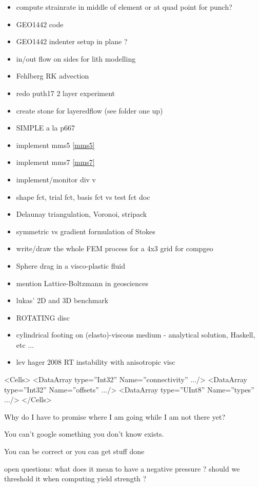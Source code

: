 \begin{itemize}
\item compute strainrate in middle of element or at quad point for punch?
\item GEO1442 code 
\item GEO1442 indenter setup in plane ?
\item in/out flow on sides for lith modelling
\item Fehlberg RK advection
\item redo puth17 2 layer experiment
\item create stone for layeredflow (see folder one up)
\item SIMPLE a la p667 \cite{john16} 
\item implement mms5 \ref{mms5}
\item implement mms7 \ref{mms7}
\item implement/monitor div v
\item shape fct, trial fct, basis fct vs test fct doc
\item Delaunay triangulation, Voronoi, stripack
\item symmetric vs gradient formulation of Stokes
\item write/draw the whole FEM process for a 4x3 grid for compgeo
\item Sphere drag in a visco-plastic fluid \cite{bemj04}
\item mention Lattice-Boltzmann in geosciences \cite{hupc08}
\item lukas' 2D and 3D benchmark
\item ROTATING disc
\item cylindrical footing on (elasto)-viscous medium - analytical solution, Haskell, etc ...
\item lev hager 2008 RT instability with anisotropic visc
\end{itemize}

 <Cells>
      <DataArray type=”Int32” Name=”connectivity” .../>
      <DataArray type=”Int32” Name=”offsets” .../>
      <DataArray type=”UInt8” Name=”types” .../>
    </Cells>


Why do I have to promise where I am going while I am not there yet?

You can't google something you don't know exists.

You can be correct or you can get stuff done

open questions:
what does it mean to have a negative pressure ? should we threshold it when computing yield strength ? 

